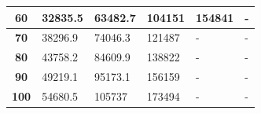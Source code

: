 \begin{table}[H]
\begin{tabular}{|c|l|l|l|l|l|}
\textbf{60}                                                                         & 32835.5                              & 63482.7                               & 104151                                & 154841                                & -                                     \\ \hline
\textbf{70}                                                                         & 38296.9                              & 74046.3                               & 121487                                & -                                     & -                                     \\ \hline
\textbf{80}                                                                         & 43758.2                              & 84609.9                               & 138822                                & -                                     & -                                     \\ \hline
\textbf{90}                                                                         & 49219.1                              & 95173.1                               & 156159                                & -                                     & -                                     \\ \hline
\textbf{100}                                                                        & 54680.5                              & 105737                                & 173494                                & -                                     & -                                     \\ \hline
\end{tabular}
\end{table}


